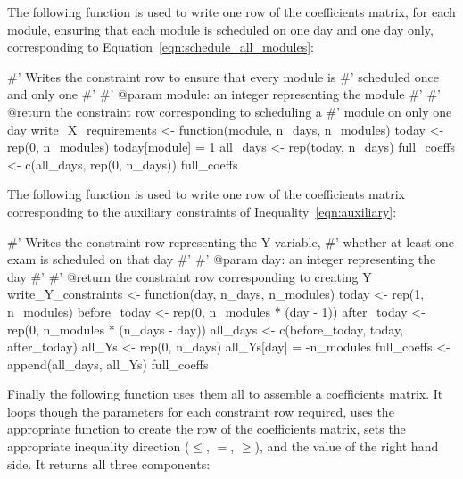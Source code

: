 The following function is used to write one row of the coefficients matrix, for
each module, ensuring that each module is scheduled on one day and one day only,
corresponding to Equation~\ref{eqn:schedule_all_modules}:

\begin{Rin}
#' Writes the constraint row to ensure that every module is
#' scheduled once and only one
#'
#' @param module: an integer representing the module
#'
#' @return the constraint row corresponding to scheduling a
#'         module on only one day
write_X_requirements <- function(module, n_days, n_modules){
  today <- rep(0, n_modules)
  today[module] = 1
  all_days <- rep(today, n_days)
  full_coeffs <- c(all_days, rep(0, n_days))
  full_coeffs
}
\end{Rin}

The following function is used to write one row of the coefficients matrix
corresponding to the auxiliary constraints of Inequality~\ref{eqn:auxiliary}:

\begin{Rin}
#' Writes the constraint row representing the Y variable,
#' whether at least one exam is scheduled on that day
#'
#' @param day: an integer representing the day
#'
#' @return the constraint row corresponding to creating Y
write_Y_constraints <- function(day, n_days, n_modules){
  today <- rep(1, n_modules)
  before_today <- rep(0, n_modules * (day - 1))
  after_today <- rep(0, n_modules * (n_days - day))
  all_days <- c(before_today, today, after_today)
  all_Ys <- rep(0, n_days)
  all_Ys[day] = -n_modules
  full_coeffs <- append(all_days, all_Ys)
  full_coeffs
}
\end{Rin}

Finally the following function uses them all to assemble a coefficients matrix.
It loops though the parameters for each constraint row required, uses the
appropriate function to create the row of the coefficients matrix, sets the
appropriate inequality direction ($\leq$, $=$, $\geq$), and the value of the
right hand side.
It returns all three components:

